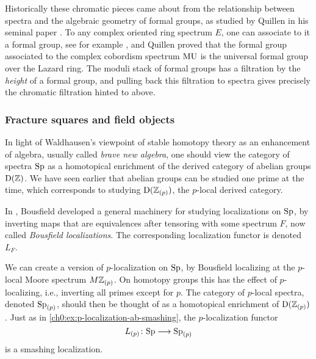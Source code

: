\begin{remark}
    \label{ch0:rm:quillen-formal-groups}
    Historically these chromatic pieces came about from the relationship between spectra and the algebraic geometry of formal groups, as studied by Quillen in his seminal paper \cite{quillen_1969}. To any complex oriented ring spectrum $E$, one can associate to it a formal group, see for example \cite[Appendix 2]{ravenel_86}, and Quillen proved that the formal group associated to the complex cobordism spectrum $\mathrm{MU}$ is the universal formal group over the Lazard ring. The moduli stack of formal groups has a filtration by the \emph{height} of a formal group, and pulling back this filtration to spectra gives precisely the chromatic filtration hinted to above. 
\end{remark}

\subsubsection{Fracture squares and field objects}
\label{ch0:sssec:fracture-squares}

In light of Waldhausen's viewpoint of stable homotopy theory as an enhancement of algebra, usually called \emph{brave new algebra}, one should view the category of spectra $\mathrm{Sp}$ as a homotopical enrichment of the derived category of abelian groups $\mathrm{D}(\mathbb{Z})$. We have seen earlier that abelian groups can be studied one prime at the time, which corresponds to studying $\mathrm{D}(\mathbb{Z}_{(p)})$, the $p$-local derived category. 

In \cite{bousfield_1979_localization}, Bousfield developed a general machinery for studying localizations on $\mathrm{Sp}$, by inverting maps that are equivalences after tensoring with some spectrum $F$, now called \emph{Bousfield localizations}. The corresponding localization functor is denoted $L_F$. 

\begin{example}
    We can create a version of $p$-localization on $\mathrm{Sp}$, by Bousfield localizing at the $p$-local Moore spectrum $M\mathbb{Z}_{(p)}$. On homotopy groups this has the effect of $p$-localizing, i.e., inverting all primes except for $p$. The category of $p$-local spectra, denoted $\mathrm{Sp}_{(p)}$, should then be thought of as a homotopical enrichment of $\mathrm{D}(\mathbb{Z}_{(p)})$. Just as in \cref{ch0:ex:p-localization-ab-smashing}, the $p$-localization functor 
    \[L_{(p)} \colon\mathrm{Sp} \longrightarrow \mathrm{Sp}_{(p)}\] 
    is a smashing localization. 
\end{example}


